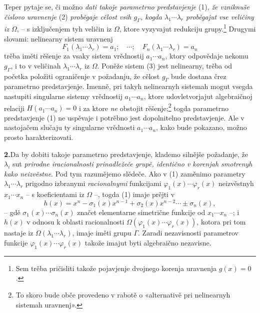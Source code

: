 \documentclass[11pt]{article}
\begin{document}
Teper pytaje se, či možno {\itshape dati takoje parametrno predstavjenje} (1), {\itshape že vzniknuše čislovo uravnenje} (2) {\itshape proběgaje cělost vsih $g_\Gamma$, kogda $\lambda_1\cdots\lambda_r$ proběgajut vse veličiny iz $\Omega$}, -- s izključenjem tyh veličin iz $\Omega$, ktore vyzyvajut redukciju grupy.\footnote{Sem trěba pričisliti takože pojavjenje dvojnego korenja uravnenja $g(x)=0$.} Drugymi slovami: nelinearny sistem uravnenj
\begin{equation}
 F_1(\lambda_1\cdots\lambda_r)=a_1;\quad \cdots;\quad F_n(\lambda_1\cdots\lambda_r)=a_n
\tag{3}
\end{equation}
trěba iměti rěšenje za vsaky sistem vrědnostij $a_1\cdots a_n$, ktory odpovědaje nekomu $g_\Gamma$, i to v veličinah $\lambda_1\cdots\lambda_r$ iz $\Omega$. Poněže sistem (3) jest nelinearny, trěba od početka položiti ograničenje v požadanju, že cělost $g_\Gamma$ bude dostana črez parametrno predstavjenje. Imenně, pri takyh nelinearnyh sistemah mogut vsegda nastupiti singularne sistemy vrědnostij $a_1\cdots a_n$, ktore udovletvorjajut algebraičnoj relaciji $H(a_1\cdots a_n)=0$ i za ktore {\itshape ne} obstojit rěšenje;\footnote{To skoro bude obče provedeno v rabotě o «alternativě pri nelinearnyh sistemah uravnenj».} togda parametrno predstavjenje (1) ne uspěvaje i potrěbno jest dopolnitelno predstavjenje. Ale v nastojačem slučaju ty singularne vrědnosti $a_1\cdots a_n$, kako bude pokazano, možno prosto harakterizovati.

\noindent\textbf{2.}\quad Da by dobiti takoje parametrno predstavjenje, klademo silnějše požadanje, že $\lambda_i$ sut {\itshape prirodne iracionalnosti prinadležeče grupě, identično v korenjah smotrenyh kako neizvěstne}. Pod tym razumějemo slědeče. Ako v (1) zaměnimo parametry $\lambda_1\cdots\lambda_r$ prigodno izbranymi {\itshape racionalnymi} funkcijami $\varphi_1(x)\cdots\varphi_r(x)$ neizvěstnyh $x_1\cdots x_n$ -- s koeficientami iz $\Omega$ --, togda (1) imaje prějti v
\begin{equation}
 h(x)=x^n-\sigma_1(x)x^{n-1}+\sigma_2(x)x^{n-2}\cdots\pm\sigma_n(x),
\tag{4}
\end{equation}
-- gdě $\sigma_1(x)\cdots\sigma_n(x)$ značet elementarne simetrične funkcije od $x_1\cdots x_n$ --; i $h(x)$ v odnosu k oblasti racionalnosti $\Omega(\varphi_1(x)\cdots\varphi_r(x))$, kotora pri tom nastaje iz $\Omega(\lambda_1\cdots\lambda_r)$, imaje iměti grupu $\Gamma$. Zaradi nezavisnosti parametrov funkcije $\varphi_1(x)\cdots\varphi_r(x)$ takože imajut byti algebraično nezavisne.
\end{document}
